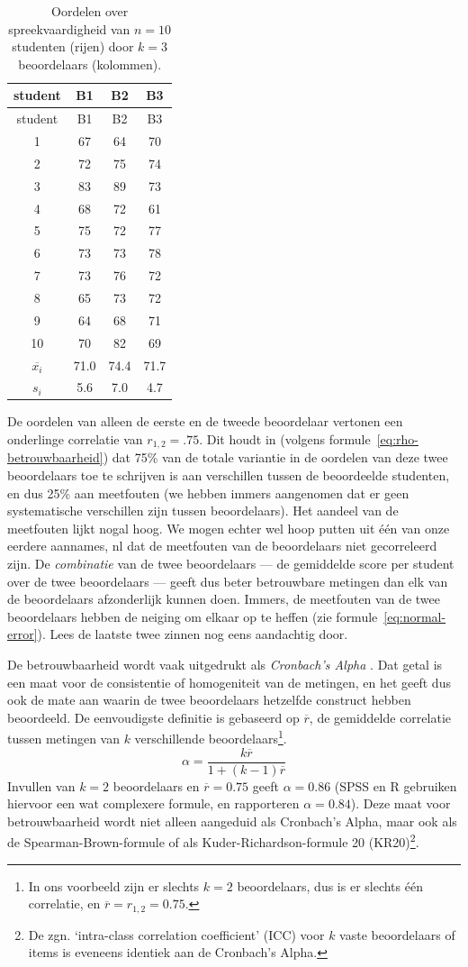 \documentclass[
]{book}
\begin{document}
\begin{longtable}[]{@{}cccc@{}}
\caption{\label{tab:betrouwbaarheid} Oordelen over spreekvaardigheid van \(n = 10\) studenten (rijen) door
\(k = 3\) beoordelaars (kolommen).}\tabularnewline
\toprule
student & B1 & B2 & B3\tabularnewline
\midrule
\endfirsthead
\toprule
student & B1 & B2 & B3\tabularnewline
\midrule
\endhead
1 & 67 & 64 & 70\tabularnewline
2 & 72 & 75 & 74\tabularnewline
3 & 83 & 89 & 73\tabularnewline
4 & 68 & 72 & 61\tabularnewline
5 & 75 & 72 & 77\tabularnewline
6 & 73 & 73 & 78\tabularnewline
7 & 73 & 76 & 72\tabularnewline
8 & 65 & 73 & 72\tabularnewline
9 & 64 & 68 & 71\tabularnewline
10 & 70 & 82 & 69\tabularnewline
\(\overline{x_i}\) & 71.0 & 74.4 & 71.7\tabularnewline
\(s_i\) & 5.6 & 7.0 & 4.7\tabularnewline
\bottomrule
\end{longtable}

De oordelen van alleen de eerste en de tweede beoordelaar vertonen een
onderlinge correlatie van \(r_{1,2}=.75\). Dit houdt in (volgens
formule~\eqref{eq:rho-betrouwbaarheid}) dat 75\% van de totale variantie in
de oordelen van deze twee beoordelaars toe te schrijven is aan
verschillen tussen de beoordeelde studenten, en dus 25\% aan meetfouten
(we hebben immers aangenomen dat er geen systematische verschillen zijn
tussen beoordelaars). Het aandeel van de meetfouten lijkt nogal hoog. We
mogen echter wel hoop putten uit één van onze eerdere aannames, nl dat
de meetfouten van de beoordelaars niet gecorreleerd zijn. De
\emph{combinatie} van de twee beoordelaars --- de gemiddelde score per
student over de twee beoordelaars --- geeft dus beter betrouwbare
metingen dan elk van de beoordelaars afzonderlijk kunnen doen. Immers,
de meetfouten van de twee beoordelaars hebben de neiging om elkaar op te
heffen (zie formule~\eqref{eq:normal-error}).
Lees de laatste twee zinnen nog eens aandachtig door.

De betrouwbaarheid wordt vaak uitgedrukt als \emph{Cronbach's Alpha}
\citep{Cort93}. Dat getal is een maat voor de consistentie of homogeniteit
van de metingen, en het geeft dus ook de mate aan waarin de twee
beoordelaars hetzelfde construct hebben beoordeeld. De eenvoudigste
definitie is gebaseerd op \(\overline{r}\), de gemiddelde correlatie
tussen metingen van \(k\) verschillende beoordelaars\footnote{In ons voorbeeld zijn er slechts \(k=2\) beoordelaars, dus is er slechts één correlatie, en \(\overline{r} = r_{1,2} = 0.75\).}.
\begin{equation}
  \label{eq:cronbach-corr}
  \alpha = \frac{k \overline{r}} {1+(k-1)\overline{r}}
\end{equation}
Invullen van \(k=2\) beoordelaars en \(\overline{r}=0.75\) geeft \(\alpha=0.86\) (SPSS en R
gebruiken hiervoor een wat complexere formule, en rapporteren
\(\alpha=0.84\)). Deze maat voor betrouwbaarheid wordt niet alleen
aangeduid als Cronbach's Alpha, maar ook als de Spearman-Brown-formule
of als Kuder-Richardson-formule 20 (KR20)\footnote{De zgn. `intra-class correlation coefficient' (ICC) voor \(k\) vaste beoordelaars of items is eveneens identiek aan de Cronbach's Alpha.}.
\end{document}
